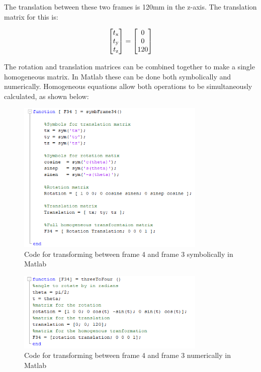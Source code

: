 \documentclass [11pt]{report}
\begin{document}
The translation between these two frames is 120mm in the z-axis. The translation matrix for this is:

\begin{equation*}
\begin{bmatrix}
t\textsubscript{x}\\
t\textsubscript{y}\\
t\textsubscript{z}\\
\end{bmatrix}
=
\begin{bmatrix}
0\\
0\\
120\\
\end{bmatrix}
\end{equation*}

The rotation and translation matrices can be combined together to make a single homogeneous matrix. In Matlab these can be done both symbolically and numerically. Homogeneous equations allow both operations to be simultaneously calculated, as shown below:

\begin{figure}[H]
\centerline{\includegraphics[width=9cm]{symbFrame34.png}}
\caption{Code for transforming between frame 4 and frame 3 symbolically in Matlab}
\label{fig}
\end{figure}


\begin{figure}[H]
\centerline{\includegraphics[width=9cm]{threeToFourcode.png}}
\caption{Code for transforming between frame 4 and frame 3 numerically in Matlab}
\label{fig}
\end{figure}
\end{document}
